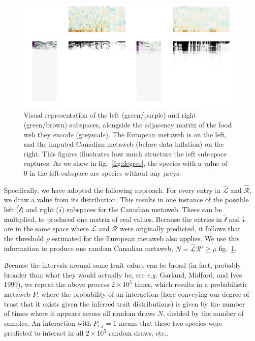 \documentclass[10pt,oneside]{article}
\makeatletter
\def\maxwidth{\ifdim\Gin@nat@width>\linewidth\linewidth
\else\Gin@nat@width\fi}
\let\Oldincludegraphics\includegraphics
\renewcommand{\includegraphics}[1]{\Oldincludegraphics[width=\maxwidth]{#1}}
\makeatother
\begin{document}
\begin{figure}
\hypertarget{fig:subspaces}{%
\centering
\includegraphics{figures/figure-subspaces.png}
\caption{Visual representation of the left (green/purple) and right
(green/brown) subspaces, alongside the adjacency matrix of the food web
they encode (greyscale). The European metaweb is on the left, and the
imputed Canadian metaweb (before data inflation) on the right. This
figures illustrates how much structure the left sub-space captures. As
we show in fig.~\ref{fig:degree}, the species with a value of 0 in the
left subspace are species without any preys.}\label{fig:subspaces}
}
\end{figure}

Specifically, we have adopted the following approach. For every entry in
\(\hat{\mathcal{L}}\) and \(\hat{\mathcal{R}}\), we draw a value from
its distribution. This results in one instance of the possible left
(\(\hat{\mathcal{l}}\)) and right (\(\hat{\mathcal{r}}\)) subspaces for
the Canadian metaweb. These can be multiplied, to produced one matrix of
real values. Because the entries in \(\hat{\mathcal{l}}\) and
\(\hat{\mathcal{r}}\) are in the same space where \(\mathcal{L}\) and
\(\mathcal{R}\) were originally predicted, it follows that the threshold
\(\rho\) estimated for the European metaweb also applies. We use this
information to produce one random Canadian metaweb,
\(N = \hat{\mathcal{L}}\)\(\hat{\mathcal{R}}' \ge \rho\)
fig.~\ref{fig:subspaces}.

Because the intervals around some trait values can be broad (in fact,
probably broader than what they would actually be, see \emph{e.g.}
Garland, Midford, and Ives 1999), we repeat the above process
\(2\times 10^5\) times, which results in a probabilistic metaweb \(P\),
where the probability of an interaction (here conveying our degree of
trust that it exists given the inferred trait distributions) is given by
the number of times where it appears across all random draws \(N\),
divided by the number of samples. An interaction with \(P_{i,j} = 1\)
means that these two species were predicted to interact in all
\(2\times 10^5\) random draws, etc..
\end{document}
